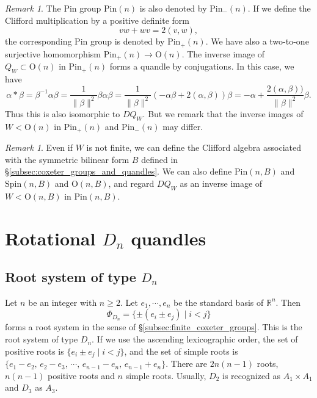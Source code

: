 \documentclass{amsart}
\theoremstyle{definition}
\theoremstyle{remark}
\newtheorem{remark}[theorem]{Remark}
\numberwithin{equation}{section}
\begin{document}
\begin{remark}
The Pin group $\mathrm{Pin}(n)$ is also denoted by $\mathrm{Pin}_-(n)$.
If we define the Clifford multiplication by a positive definite form 
\[
v w + w v = 2(v ,w),
\]
the corresponding Pin group is denoted by $\mathrm{Pin}_+(n)$.
We have also a two-to-one surjective homomorphism $\mathrm{Pin}_+(n) \to \mathrm{O}(n)$.
The inverse image of $Q_W \subset \mathrm{O}(n)$ in $\mathrm{Pin}_+(n)$ forms 
a quandle by conjugations. In this case, we have 
\[
\alpha * \beta = \beta^{-1} \alpha \beta
= \frac{1}{\| \beta \|^2} \beta \alpha \beta
= \frac{1}{\| \beta \|^2} (-\alpha \beta + 2 (\alpha, \beta))\beta
= -\alpha + \frac{2 (\alpha, \beta))}{\| \beta \|^2} \beta.
\]
Thus this is also isomorphic to $DQ_W$.
But we remark that the inverse images of $W < \mathrm{O}(n)$ in 
$\mathrm{Pin}_{+}(n)$  and $\mathrm{Pin}_{-}(n)$ may differ.
\end{remark}

\begin{remark}
Even if $W$ is not finite, we can define the Clifford algebra associated with
the symmetric bilinear form $B$ defined in \S \ref{subsec:coxeter_groups_and_quandles}. 
We can also define $\mathrm{Pin}(n, B)$ and $\mathrm{Spin}(n, B)$ 
and $\mathrm{O}(n, B)$, and regard $DQ_W$ as an inverse image of 
$W < \mathrm{O}(n, B)$ in $\mathrm{Pin}(n, B)$.
\end{remark}



\section{Rotational $D_n$ quandles}
\label{sec:rotational_D_n}
\subsection{Root system of  type $D_n$}
\label{subsec:root_system_of_type_D_n}
Let $n$ be an integer with $n \geq 2$. 
Let $e_1, \cdots , e_n$ be the standard basis of $\mathbb{R}^n$.
Then
\[
\Phi_{D_n} = \{ \pm (e_i \pm e_{j}) \mid i < j \}
\]
forms a root system in the sense of \S \ref{subsec:finite_coxeter_groups}. 
This is the root system of type $D_n$.
If we use the ascending lexicographic order, 
the set of positive roots is $\{ e_i \pm e_j  \mid i < j \}$, 
and the set of simple roots is 
$\{ e_1 - e_2, \, e_2 - e_3, \, \cdots , \, e_{n-1} - e_n, \, e_{n-1} + e_n \}$.
There are $2 n(n-1)$ roots, $n (n-1)$ positive roots and $n$ simple roots.
Usually, $D_2$ is recognized as $A_1 \times A_1$ and $D_3$ as $A_3$.
\end{document}
